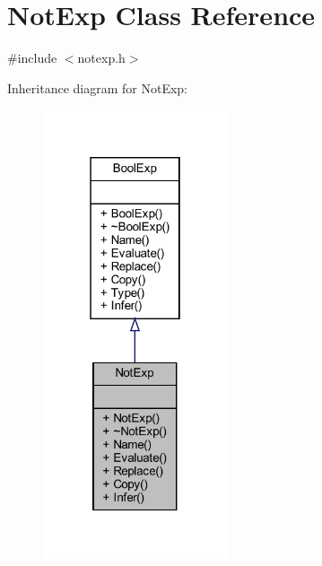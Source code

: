 \hypertarget{classNotExp}{}\section{Not\+Exp Class Reference}
\label{classNotExp}


{\ttfamily \#include $<$notexp.\+h$>$}



Inheritance diagram for Not\+Exp\+:
\nopagebreak
\begin{figure}[H]
\begin{center}
\leavevmode
\includegraphics[width=154pt]{classNotExp__inherit__graph}
\end{center}
\end{figure}


